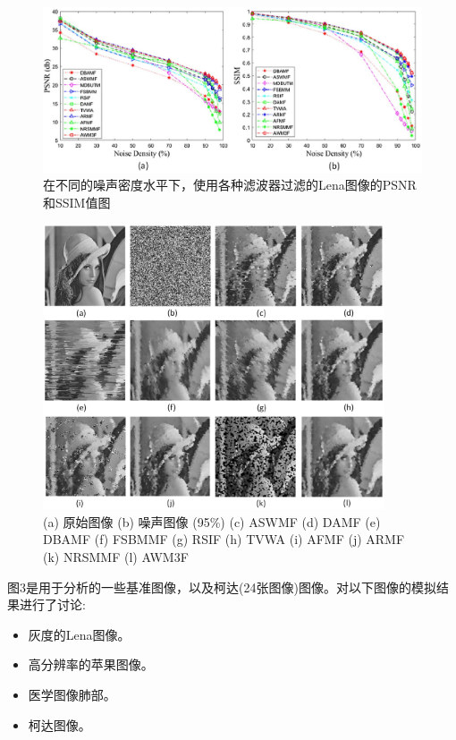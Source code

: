 \documentclass[12pt]{article} %
\begin{document}
\begin{figure}[H]
    \centering
    \includegraphics[width=1\textwidth]{images/05.eps}    
    \caption{在不同的噪声密度水平下，使用各种滤波器过滤的Lena图像的PSNR和SSIM值图}
\end{figure}
\begin{figure}[H]
    \centering
    \includegraphics[width=0.9\textwidth]{images/06.eps}    
    \caption{(a) 原始图像 (b) 噪声图像 (95\%) (c) ASWMF (d) DAMF (e) DBAMF (f) FSBMMF (g) RSIF (h) TVWA (i) AFMF (j) ARMF (k) NRSMMF (l) AWM3F}
\end{figure}

\newpage
图3是用于分析的一些基准图像，以及柯达(24张图像)图像。对以下图像的模拟结果进行了讨论:
\begin{itemize}
    \item 灰度的Lena图像。
    \item 高分辨率的苹果图像。
    \item 医学图像肺部。
    \item 柯达图像。
\end{itemize}
\end{document}
